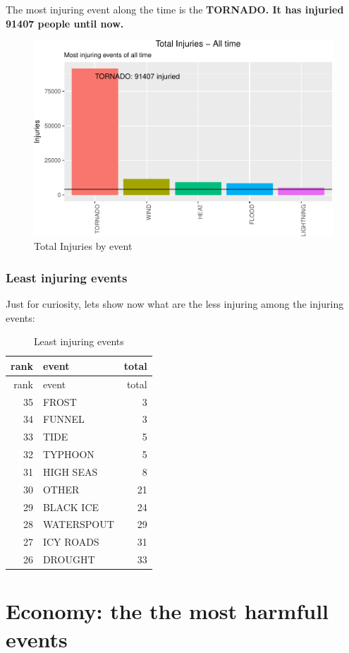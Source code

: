 \documentclass[]{article}
\begin{document}
The most injuring event along the time is the \textbf{TORNADO. It has
injuried 91407 people until now.}

\begin{figure}[htbp]
\centering
\includegraphics{readme_files/figure-latex/injuring-all-plot-1.pdf}
\caption{Total Injuries by event}
\end{figure}

\subsubsection{Least injuring events}\label{least-injuring-events}

Just for curiosity, lets show now what are the less injuring among the
injuring events:

\begin{longtable}[]{@{}rlr@{}}
\caption{Least injuring events}\tabularnewline
\toprule
rank & event & total\tabularnewline
\midrule
\endfirsthead
\toprule
rank & event & total\tabularnewline
\midrule
\endhead
35 & FROST & 3\tabularnewline
34 & FUNNEL & 3\tabularnewline
33 & TIDE & 5\tabularnewline
32 & TYPHOON & 5\tabularnewline
31 & HIGH SEAS & 8\tabularnewline
30 & OTHER & 21\tabularnewline
29 & BLACK ICE & 24\tabularnewline
28 & WATERSPOUT & 29\tabularnewline
27 & ICY ROADS & 31\tabularnewline
26 & DROUGHT & 33\tabularnewline
\bottomrule
\end{longtable}

\section{Economy: the the most harmfull
events}\label{economy-the-the-most-harmfull-events}
\end{document}

